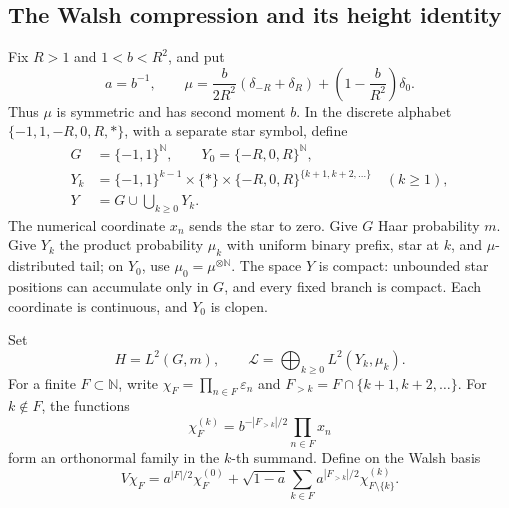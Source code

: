 \documentclass[11pt,letterpaper]{amsart}
\theoremstyle{definition}
\theoremstyle{remark}
\numberwithin{equation}{section}
\begin{document}
\subsection{The Walsh compression and its height identity}

Fix \(R>1\) and \(1<b<R^2\), and put
\[
 a=b^{-1},\qquad
 \mu=\frac{b}{2R^2}(\delta_{-R}+\delta_R)
                  +\left(1-\frac b{R^2}\right)\delta_0.
\]
Thus \(\mu\) is symmetric and has second moment \(b\).
In the discrete alphabet \(\{-1,1,-R,0,R,*\}\), with a separate
star symbol, define
\[
 \begin{split}
 G&=\{-1,1\}^{\mathbb N},\qquad Y_0=\{-R,0,R\}^{\mathbb N},\\
 Y_k&=\{-1,1\}^{k-1}\times\{*\}\times
        \{-R,0,R\}^{\{k+1,k+2,\ldots\}}\quad(k\ge1),\\
 Y&=G\cup\bigcup_{k\ge0}Y_k.
 \end{split}
\]
The numerical coordinate \(x_n\) sends the star to zero.
Give \(G\) Haar probability \(m\). Give \(Y_k\) the product
probability \(\mu_k\) with uniform binary prefix, star at \(k\),
and \(\mu\)-distributed tail; on \(Y_0\), use
\(\mu_0=\mu^{\otimes\mathbb N}\).
The space \(Y\) is compact: unbounded star positions can accumulate
only in \(G\), and every fixed branch is compact.
Each coordinate is continuous, and \(Y_0\) is clopen.

Set
\[
 H=L^2(G,m),\qquad
 \mathcal L=\bigoplus_{k\ge0}L^2(Y_k,\mu_k).
\]
For a finite \(F\subset\mathbb N\), write
\(\chi_F=\prod_{n\in F}\varepsilon_n\) and
\(F_{>k}=F\cap\{k+1,k+2,\ldots\}\).
For \(k\notin F\), the functions
\[
                  \chi_F^{(k)}
        =b^{-|F_{>k}|/2}\prod_{n\in F}x_n
\]
form an orthonormal family in the \(k\)-th summand.
Define on the Walsh basis
\begin{equation}\label{eq:V}
 V\chi_F=a^{|F|/2}\chi_F^{(0)}
       +\sqrt{1-a}\sum_{k\in F}
            a^{|F_{>k}|/2}\chi_{F\setminus\{k\}}^{(k)}.
\end{equation}
\end{document}
